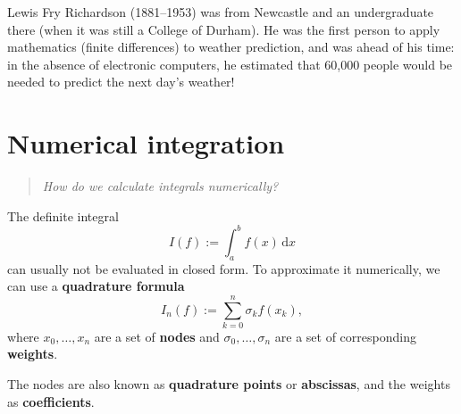 \documentclass[
  letterpaper,
  DIV=11,
  numbers=noendperiod]{scrreprt}
\begin{document}
\begin{tcolorbox}[enhanced jigsaw, bottomrule=.15mm, colbacktitle=quarto-callout-note-color!10!white, breakable, arc=.35mm, coltitle=black, colback=white, bottomtitle=1mm, opacityback=0, title=\textcolor{quarto-callout-note-color}{\faInfo}\hspace{0.5em}{Note}, titlerule=0mm, toptitle=1mm, opacitybacktitle=0.6, colframe=quarto-callout-note-color-frame, leftrule=.75mm, rightrule=.15mm, left=2mm, toprule=.15mm]

Lewis Fry Richardson (1881--1953) was from Newcastle and an
undergraduate there (when it was still a College of Durham). He was the
first person to apply mathematics (finite differences) to weather
prediction, and was ahead of his time: in the absence of electronic
computers, he estimated that 60,000 people would be needed to predict
the next day's weather!

\end{tcolorbox}

\section{Numerical integration}\label{s-int}

\begin{quote}
\emph{How do we calculate integrals numerically?}
\end{quote}

The definite integral \[
I(f) := \int_a^b f(x)\,\mathrm{d}x
\] can usually not be evaluated in closed form. To approximate it
numerically, we can use a \textbf{quadrature formula} \[
I_n(f) := \sum_{k=0}^n \sigma_k f(x_k),
\] where \(x_0,\ldots,x_n\) are a set of \textbf{nodes} and
\(\sigma_0,\ldots,\sigma_n\) are a set of corresponding
\textbf{weights}.

\begin{tcolorbox}[enhanced jigsaw, bottomrule=.15mm, colbacktitle=quarto-callout-note-color!10!white, breakable, arc=.35mm, coltitle=black, colback=white, bottomtitle=1mm, opacityback=0, title=\textcolor{quarto-callout-note-color}{\faInfo}\hspace{0.5em}{Note}, titlerule=0mm, toptitle=1mm, opacitybacktitle=0.6, colframe=quarto-callout-note-color-frame, leftrule=.75mm, rightrule=.15mm, left=2mm, toprule=.15mm]

The nodes are also known as \textbf{quadrature points} or
\textbf{abscissas}, and the weights as \textbf{coefficients}.

\end{tcolorbox}
\end{document}

